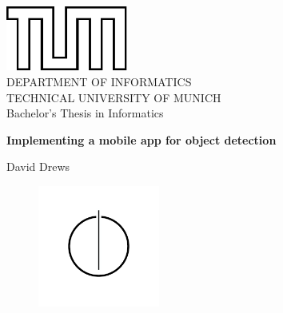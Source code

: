 \documentclass[11pt,
               a4paper,
               bibtotoc,
               idxtotoc,
               headsepline,
               footsepline,
               footexclude,
               BCOR12mm,
               DIV13,
               openany,   %
               ]
               {scrbook}
\def\doctype{Bachelor's Thesis\xspace}
\def\studyProgram{Informatics}
\def\title{Implementing a mobile app for object detection}
\def\author{David Drews}
\begin{document}
\frontmatter

\def\bcorcor{0.15cm}
\addtolength{\hoffset}{\bcorcor}
\thispagestyle{empty}
\vspace{4cm}
\begin{center}
    \includegraphics[width=4cm]{templateStuff/tumlogo.pdf}\\[5mm]
    \huge DEPARTMENT OF INFORMATICS\\[5mm]
    \large TECHNICAL UNIVERSITY OF MUNICH\\[24mm]

    {\Large \doctype in \studyProgram}\\[20mm]
    {\huge\bf \title\par}
    \vspace{15mm}
    {\LARGE  \author}
    \vspace{10mm}
    \begin{figure}[h!]
        \centering
        \includegraphics[width=4cm]{templateStuff/informat.pdf}
   \end{figure}
\end{center}

\cleardoubleemptypage

\end{document}
